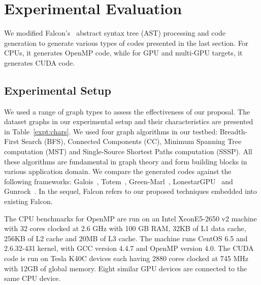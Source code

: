 \section{Experimental Evaluation}\label{sec:results}
We modified Falcon's~\cite{falcon} abstract syntax tree (AST) processing and code generation to generate various types of codes presented in the last section.
For CPUs, it generates OpenMP code, while for GPU and multi-GPU targets, it generates CUDA code.

\subsection{Experimental Setup}\label{expt:setup}
We used a range of graph types to assess the effectiveness of our proposal.
The dataset graphs in our experimental setup and their characteristics are presented in Table~\ref{expt:chars}.
We used four graph algorithms in our testbed: Breadth-First Search (BFS), Connected Components (CC), Minimum Spanning Tree computation (MST) and Single-Source Shortest Paths computation (SSSP).
All these algorithms are fundamental in graph theory and form building blocks in various application domain.
We compare the generated codes against the following frameworks: Galois~\cite{Pingali:2011:TPA:1993316.1993501}, Totem~\cite{Gharaibeh:2012:YOT:2370816.2370866}, Green-Marl~\cite{Hong:2012:GDE:2150976.2151013}, LonestarGPU~\cite{nasre13:MAG:2517327.2442531} and Gunrock~\cite{Wang:2016:GHG:3016078.2851145}.
In the sequel, Falcon refers to our proposed techniques embedded into existing Falcon.

The CPU benchmarks for OpenMP are run on an Intel XeonE5-2650 v2 machine with 32 cores clocked at 2.6 GHz with 100 GB RAM, 32KB of L1 data cache, 256KB of L2 cache and 20MB of L3 cache. The machine runs CentOS 6.5 and 2.6.32-431 kernel, with GCC version 4.4.7 and OpenMP version 4.0. The CUDA code is run on Tesla K40C devices each having 2880 cores clocked at 745 MHz with 12GB of global memory. Eight similar GPU devices are connected to the same CPU device.

